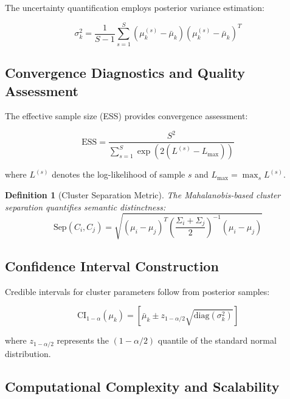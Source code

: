\documentclass[11pt,a4paper]{article}
\newtheorem{definition}[theorem]{Definition}
\begin{document}
The uncertainty quantification employs posterior variance estimation:

\begin{equation}
\sigma_k^2 = \frac{1}{S-1} \sum_{s=1}^S (\mu_k^{(s)} - \bar{\mu}_k)(\mu_k^{(s)} - \bar{\mu}_k)^T
\label{eq:posterior-variance}
\end{equation}

\subsection{Convergence Diagnostics and Quality Assessment}

The effective sample size (ESS) provides convergence assessment:

\begin{equation}
\text{ESS} = \frac{S^2}{\sum_{s=1}^S \exp(2(L^{(s)} - L_{\max}))}
\label{eq:effective-sample-size}
\end{equation}

where $L^{(s)}$ denotes the log-likelihood of sample $s$ and $L_{\max} = \max_s L^{(s)}$.

\begin{definition}[Cluster Separation Metric]
The Mahalanobis-based cluster separation quantifies semantic distinctness:
\begin{equation}
\text{Sep}(C_i, C_j) = \sqrt{(\mu_i - \mu_j)^T \left(\frac{\Sigma_i + \Sigma_j}{2}\right)^{-1} (\mu_i - \mu_j)}
\label{eq:cluster-separation}
\end{equation}
\end{definition}

\subsection{Confidence Interval Construction}

Credible intervals for cluster parameters follow from posterior samples:

\begin{equation}
\text{CI}_{1-\alpha}(\mu_k) = \left[ \bar{\mu}_k \pm z_{1-\alpha/2} \sqrt{\text{diag}(\sigma_k^2)} \right]
\label{eq:credible-intervals}
\end{equation}

where $z_{1-\alpha/2}$ represents the $(1-\alpha/2)$ quantile of the standard normal distribution.

\subsection{Computational Complexity and Scalability}
\end{document}
